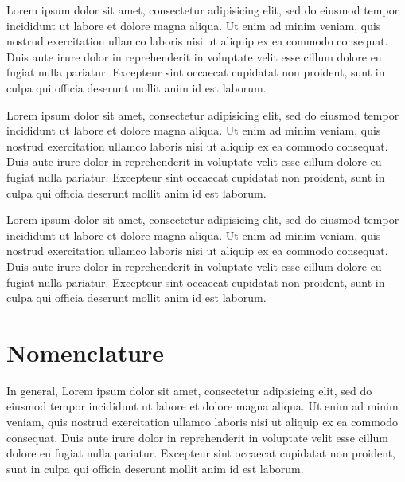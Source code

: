 \documentclass[10pt,a4paper,extrafontsizes,oldfontcommands,oneside]{memoir}
\begin{document}
Lorem ipsum dolor sit amet, consectetur adipisicing elit, sed do eiusmod tempor incididunt ut labore et dolore magna aliqua. Ut enim ad minim veniam, quis nostrud exercitation ullamco laboris nisi ut aliquip ex ea commodo consequat. Duis aute irure dolor in reprehenderit in voluptate velit esse cillum dolore eu fugiat nulla pariatur. Excepteur sint occaecat cupidatat non proident, sunt in culpa qui officia deserunt mollit anim id est laborum.

Lorem ipsum dolor sit amet, consectetur adipisicing elit, sed do eiusmod tempor incididunt ut labore et dolore magna aliqua. Ut enim ad minim veniam, quis nostrud exercitation ullamco laboris nisi ut aliquip ex ea commodo consequat. Duis aute irure dolor in reprehenderit in voluptate velit esse cillum dolore eu fugiat nulla pariatur. Excepteur sint occaecat cupidatat non proident, sunt in culpa qui officia deserunt mollit anim id est laborum.

Lorem ipsum dolor sit amet, consectetur adipisicing elit, sed do eiusmod tempor incididunt ut labore et dolore magna aliqua. Ut enim ad minim veniam, quis nostrud exercitation ullamco laboris nisi ut aliquip ex ea commodo consequat. Duis aute irure dolor in reprehenderit in voluptate velit esse cillum dolore eu fugiat nulla pariatur. Excepteur sint occaecat cupidatat non proident, sunt in culpa qui officia deserunt mollit anim id est laborum.


\clearpage

\begin{hideshorttoc}

\printshorttoc

\end{hideshorttoc}


\clearpage
\printmaintoc


\clearpage

\listoffigures
\clearpage
\listoftables
\clearpage


\chapter*{Nomenclature}

In general, Lorem ipsum dolor sit amet, consectetur adipisicing elit, sed do eiusmod tempor incididunt ut labore et dolore magna aliqua. Ut enim ad minim veniam, quis nostrud exercitation ullamco laboris nisi ut aliquip ex ea commodo consequat. Duis aute irure dolor in reprehenderit in voluptate velit esse cillum dolore eu fugiat nulla pariatur. Excepteur sint occaecat cupidatat non proident, sunt in culpa qui officia deserunt mollit anim id est laborum.
\end{document}
